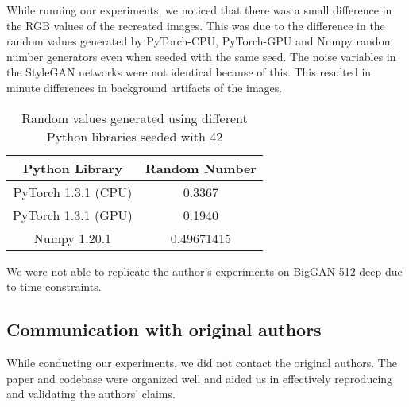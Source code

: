 While running our experiments, we noticed that there was a small difference in the RGB values of the recreated images. This was due to the difference in the random values generated by PyTorch-CPU, PyTorch-GPU and Numpy random number generators even when seeded with the same seed. The noise variables in the StyleGAN networks were not identical because of this. This resulted in minute differences in background artifacts of the images.

\begin{table}[H]
\centering
\begin{tabular}{cc}
\hline
Python Library & Random Number \\ \hline
PyTorch 1.3.1 (CPU)     & 0.3367                 \\
PyTorch 1.3.1 (GPU)     & 0.1940                 \\ 
Numpy 1.20.1            & 0.49671415             \\ \hline
\end{tabular}
\caption{Random values generated using different Python libraries seeded with 42}
\end{table}

We were not able to replicate the author's experiments on BigGAN-512 deep due to time constraints. 

\subsection{Communication with original authors}

While conducting our experiments, we did not contact the original authors. The paper and codebase were organized well and aided us in effectively reproducing and validating the authors' claims.
